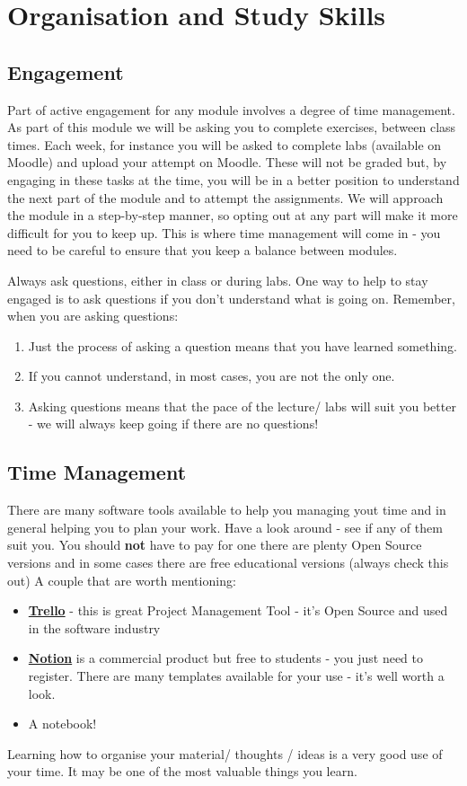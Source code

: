 \documentclass{article}
\begin{document}
\section{Organisation and Study Skills}
\subsection{Engagement}
 Part of active engagement  for any module involves a degree of time management. 
 As part of this module we will be asking you to complete exercises, between class times. 
 Each week, for instance you will be asked to complete labs (available on Moodle) and upload your attempt on Moodle.
 These will not be graded but, by engaging in these tasks at the time, you will be in a better position to 
 understand the next part of the module and to attempt the assignments. We will approach the module in a step-by-step manner, 
 so opting out at any part will make it more difficult for you to keep up. 
 This is where time management will come in - you need to be careful to ensure that you keep a balance between modules. 
 
 Always ask questions, either in class or during labs.  One way to help to stay engaged is to ask questions if you don't understand what is going on. 
 Remember, when you are asking questions:
 \begin{enumerate}
    \item Just the process of asking a question means that you have learned something. 
    \item If you cannot understand, in most cases, you are not the only one. 
    \item Asking questions means that the pace of the lecture/ labs will suit you better - we will always keep going if there are no questions! 
 \end{enumerate}
 \subsection{Time Management}
 There are many software tools available to help you managing yout time and in general helping you to plan your work. Have a look around - see if any of them suit you. You should \textbf{not} have to pay for one there are plenty Open Source versions and in some cases there are free educational versions (always check this out)
 A couple that are worth mentioning: 
 \begin{itemize}
     \item \href{https://trello.com/en}{\textbf{Trello}} - this is  great Project Management Tool - it's Open Source and used in the software industry
     \item \href{https://www.notion.so/}{\textbf{Notion}} is a commercial product but free to students - you just need to register. There are many templates available for your use - it's well worth a look. 
     \item A notebook! 
 \end{itemize}
 Learning how to organise your material/ thoughts / ideas is a very good use of your time. It may be one of the most valuable things you learn. 
 
\end{document}
